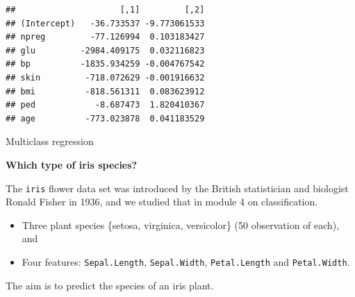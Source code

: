 \documentclass[10pt,ignorenonframetext,]{beamer}
\providecommand{\tightlist}{%
  \setlength{\itemsep}{0pt}\setlength{\parskip}{0pt}}
\begin{document}
\begin{frame}[fragile]
\begin{verbatim}
##                     [,1]         [,2]
## (Intercept)   -36.733537 -9.773061533
## npreg         -77.126994  0.103183427
## glu         -2984.409175  0.032116823
## bp          -1835.934259 -0.004767542
## skin         -718.072629 -0.001916632
## bmi          -818.561311  0.083623912
## ped            -8.687473  1.820410367
## age          -773.023878  0.041183529
\end{verbatim}

\end{frame}

\begin{frame}[fragile]{Multiclass regression}

\textbf{Which type of iris species?}

The \texttt{iris} flower data set was introduced by the British
statistician and biologist Ronald Fisher in 1936, and we studied that in
module 4 on classification.

\begin{itemize}
\tightlist
\item
  Three plant species \{setosa, virginica, versicolor\} (50 observation
  of each), and
\item
  Four features: \texttt{Sepal.Length}, \texttt{Sepal.Width},
  \texttt{Petal.Length} and \texttt{Petal.Width}.
\end{itemize}

The aim is to predict the species of an iris plant.

\end{frame}
\end{document}
